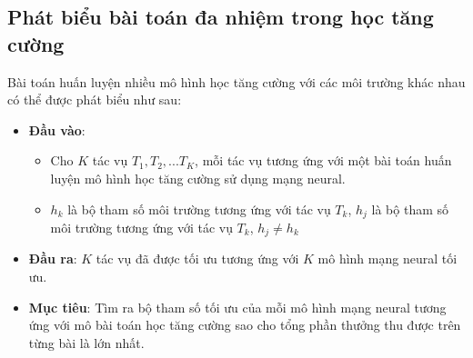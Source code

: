 \subsection{Phát biểu bài toán đa nhiệm trong học tăng cường}
Bài toán huấn luyện nhiều mô hình học tăng cường với các môi trường khác nhau có thể được phát biểu như sau:
\begin{itemize}
    \item \textbf{Đầu vào}: 
        \begin{itemize}
            \item Cho $K$ tác vụ $T_1, T_2,...T_K$, mỗi tác vụ tương ứng với một bài toán huấn luyện mô hình học tăng cường sử dụng mạng neural.
            \item $h_k$ là bộ tham số môi trường tương ứng với tác vụ $T_k$, $h_j$ là bộ tham số môi trường tương ứng với tác vụ $T_k$, $h_j \neq h_k$
        \end{itemize}
    \item \textbf{Đầu ra}: $K$ tác vụ đã được tối ưu tương ứng với $K$ mô hình mạng neural tối ưu.
    \item \textbf{Mục tiêu}: Tìm ra bộ tham số tối ưu của mỗi mô hình mạng neural tương ứng với mô bài toán học tăng cường sao cho tổng phần thưởng thu được trên từng bài là lớn nhất.
\end{itemize}

